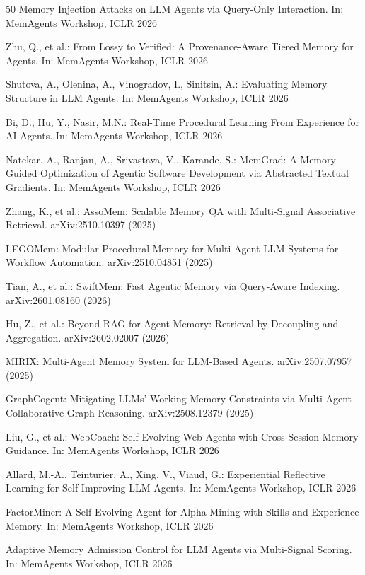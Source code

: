 \documentclass[hf]{ceurart}
\begin{document}
\begin{thebibliography}{50}
Memory Injection Attacks on LLM Agents via Query-Only Interaction.
In: MemAgents Workshop, ICLR 2026

Zhu, Q., et al.: From Lossy to Verified: A Provenance-Aware Tiered
Memory for Agents. In: MemAgents Workshop, ICLR 2026

Shutova, A., Olenina, A., Vinogradov, I., Sinitsin, A.: Evaluating
Memory Structure in LLM Agents. In: MemAgents Workshop, ICLR 2026

Bi, D., Hu, Y., Nasir, M.N.: Real-Time Procedural Learning From
Experience for AI Agents. In: MemAgents Workshop, ICLR 2026

Natekar, A., Ranjan, A., Srivastava, V., Karande, S.: MemGrad:
A Memory-Guided Optimization of Agentic Software Development via
Abstracted Textual Gradients. In: MemAgents Workshop, ICLR 2026

Zhang, K., et al.: AssoMem: Scalable Memory QA with Multi-Signal
Associative Retrieval. arXiv:2510.10397 (2025)

LEGOMem: Modular Procedural Memory for Multi-Agent LLM Systems
for Workflow Automation. arXiv:2510.04851 (2025)

Tian, A., et al.: SwiftMem: Fast Agentic Memory via Query-Aware
Indexing. arXiv:2601.08160 (2026)

Hu, Z., et al.: Beyond RAG for Agent Memory: Retrieval by Decoupling
and Aggregation. arXiv:2602.02007 (2026)

MIRIX: Multi-Agent Memory System for LLM-Based Agents.
arXiv:2507.07957 (2025)

GraphCogent: Mitigating LLMs' Working Memory Constraints via
Multi-Agent Collaborative Graph Reasoning. arXiv:2508.12379 (2025)

Liu, G., et al.: WebCoach: Self-Evolving Web Agents with
Cross-Session Memory Guidance. In: MemAgents Workshop, ICLR 2026

Allard, M.-A., Teinturier, A., Xing, V., Viaud, G.: Experiential
Reflective Learning for Self-Improving LLM Agents. In: MemAgents
Workshop, ICLR 2026

FactorMiner: A Self-Evolving Agent for Alpha Mining with Skills and
Experience Memory. In: MemAgents Workshop, ICLR 2026

Adaptive Memory Admission Control for LLM Agents via Multi-Signal
Scoring. In: MemAgents Workshop, ICLR 2026


\end{thebibliography}
\end{document}
